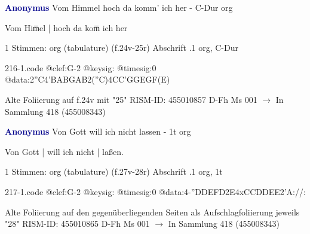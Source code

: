 \documentclass[twocolumn]{book}
\begin{document}
\newline \par \vspace{7pt} \textcolor{darkblue}{\textbf{Anonymus  }}
\newline Vom Himmel hoch da komm' ich her - C-Dur
\newline org
\newline \begin{itshape}[f.24v, at left:] Vom Him̅el | hoch da kom̅ ich her\end{itshape} 
\newline \textcolor{darkblue}{}  1 Stimmen: org (tabulature)  (f.24v-25r)
\newline Abschrift
.1  org, C-Dur  
\begin{filecontents*}{216-1.code}
@clef:G-2
@keysig:
@timesig:0
@data:2''C4'BABGAB2(''C)4CC'GGEGF(E)
\end{filecontents*}
\newline
%
\newline Alte Foliierung auf f.24v mit "25"
\newline RISM-ID: 455010857
\newline D-Fh  Ms 001
\newline $\rightarrow$ In Sammlung 418 (455008343)
      
\newline \par \vspace{7pt} \textcolor{darkblue}{\textbf{Anonymus  }}
\newline Von Gott will ich nicht lassen - 1t
\newline org
\newline \begin{itshape}[f.27v, at left:] Von Gott | will ich nicht | laßen.\end{itshape} 
\newline \textcolor{darkblue}{}  1 Stimmen: org (tabulature)  (f.27v-28r)
\newline Abschrift
.1  org, 1t  
\begin{filecontents*}{217-1.code}
@clef:G-2
@keysig:
@timesig:0
@data:4-''DDEFD2E4xCCDDEE2'A://:
\end{filecontents*}
\newline
%
\newline Alte Foliierung auf den gegenüberliegenden Seiten als Aufschlagfoliierung jeweils "28"
\newline RISM-ID: 455010865
\newline D-Fh  Ms 001
\newline $\rightarrow$ In Sammlung 418 (455008343)
      
\end{document}
